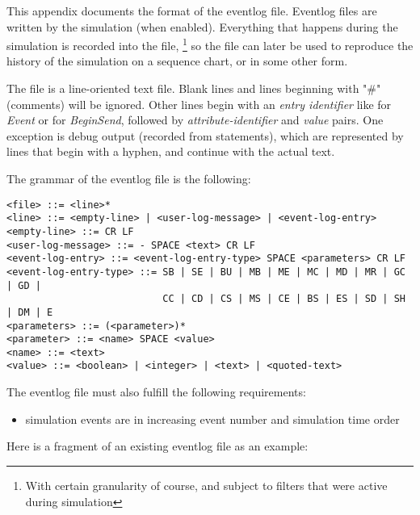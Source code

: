 \label{cha:eventlog-file-format}

This appendix documents the format of the eventlog file. Eventlog
files are written by the simulation (when enabled). Everything
that happens during the simulation is recorded into the file,
  \footnote{With certain granularity of course, and subject to
  filters that were active during simulation}
so the file can later be used to reproduce the history of the
simulation on a sequence chart, or in some other form.

The file is a line-oriented text file. Blank lines and lines beginning
with "\#" (comments) will be ignored. Other lines begin with an
\textit{entry identifier} like  for \textit{Event} or
 for \textit{BeginSend}, followed by \textit{attribute-identifier}
and \textit{value} pairs. One exception is debug output
(recorded from  statements), which are represented
by lines that begin with a hyphen, and continue with the actual text.

The grammar of the eventlog file is the following:

\begin{verbatim}
<file> ::= <line>*
<line> ::= <empty-line> | <user-log-message> | <event-log-entry>
<empty-line> ::= CR LF
<user-log-message> ::= - SPACE <text> CR LF
<event-log-entry> ::= <event-log-entry-type> SPACE <parameters> CR LF
<event-log-entry-type> ::= SB | SE | BU | MB | ME | MC | MD | MR | GC | GD |
                           CC | CD | CS | MS | CE | BS | ES | SD | SH | DM | E
<parameters> ::= (<parameter>)*
<parameter> ::= <name> SPACE <value>
<name> ::= <text>
<value> ::= <boolean> | <integer> | <text> | <quoted-text>
\end{verbatim}

The eventlog file must also fulfill the following requirements:
\begin{itemize}
   \item simulation events are in increasing event number and simulation time order
\end{itemize}

Here is a fragment of an existing eventlog file as an example:


